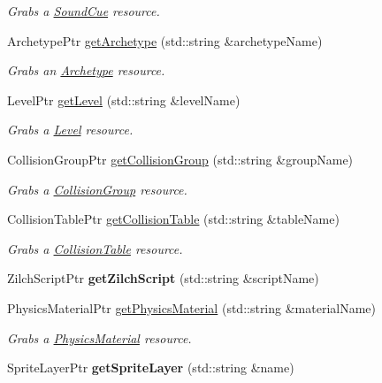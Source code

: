 \begin{DoxyCompactItemize}
\begin{DoxyCompactList}\small\item\em Grabs a \hyperlink{classDCEngine_1_1SoundCue}{Sound\-Cue} resource. \end{DoxyCompactList}\item 
Archetype\-Ptr \hyperlink{classDCEngine_1_1Systems_1_1Content_a33344031ba414b7ee28e0c5f10f495f7}{get\-Archetype} (std\-::string \&archetype\-Name)
\begin{DoxyCompactList}\small\item\em Grabs an \hyperlink{classDCEngine_1_1Archetype}{Archetype} resource. \end{DoxyCompactList}\item 
Level\-Ptr \hyperlink{classDCEngine_1_1Systems_1_1Content_ad62d0bedd6cb8a96dd49278a24c875e5}{get\-Level} (std\-::string \&level\-Name)
\begin{DoxyCompactList}\small\item\em Grabs a \hyperlink{classDCEngine_1_1Level}{Level} resource. \end{DoxyCompactList}\item 
Collision\-Group\-Ptr \hyperlink{classDCEngine_1_1Systems_1_1Content_a816e9192c6ec63a687e8274ad7eca3d8}{get\-Collision\-Group} (std\-::string \&group\-Name)
\begin{DoxyCompactList}\small\item\em Grabs a \hyperlink{classDCEngine_1_1CollisionGroup}{Collision\-Group} resource. \end{DoxyCompactList}\item 
Collision\-Table\-Ptr \hyperlink{classDCEngine_1_1Systems_1_1Content_a5bba94d4c99f486573b07a055ab3c6a3}{get\-Collision\-Table} (std\-::string \&table\-Name)
\begin{DoxyCompactList}\small\item\em Grabs a \hyperlink{classDCEngine_1_1CollisionTable}{Collision\-Table} resource. \end{DoxyCompactList}\item 
\hypertarget{classDCEngine_1_1Systems_1_1Content_ab3686fa478d2ad8d273f6dbe822f4e9e}{Zilch\-Script\-Ptr {\bfseries get\-Zilch\-Script} (std\-::string \&script\-Name)}\label{classDCEngine_1_1Systems_1_1Content_ab3686fa478d2ad8d273f6dbe822f4e9e}

\item 
Physics\-Material\-Ptr \hyperlink{classDCEngine_1_1Systems_1_1Content_a430e2a8d39850418a926aa2ac2d4964a}{get\-Physics\-Material} (std\-::string \&material\-Name)
\begin{DoxyCompactList}\small\item\em Grabs a \hyperlink{classDCEngine_1_1PhysicsMaterial}{Physics\-Material} resource. \end{DoxyCompactList}\item 
\hypertarget{classDCEngine_1_1Systems_1_1Content_af7acb2056cd63a6df488ee7376df1ce2}{Sprite\-Layer\-Ptr {\bfseries get\-Sprite\-Layer} (std\-::string \&name)}\label{classDCEngine_1_1Systems_1_1Content_af7acb2056cd63a6df488ee7376df1ce2}


\end{DoxyCompactItemize}
